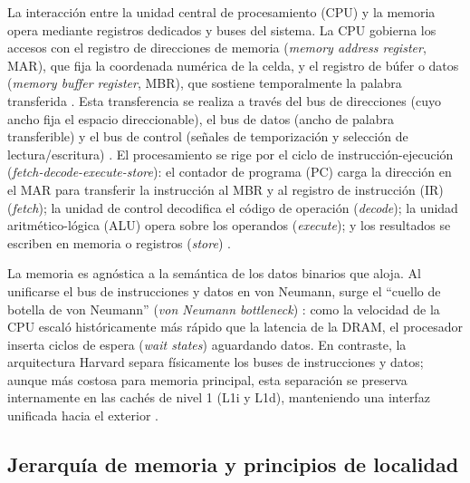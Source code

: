 \documentclass[12pt]{article}
\begin{document}
La interacción entre la unidad central de procesamiento (CPU) y la memoria opera mediante registros dedicados y buses del sistema. La CPU gobierna los accesos con el registro de direcciones de memoria (\textit{memory address register}, MAR), que fija la coordenada numérica de la celda, y el registro de búfer o datos (\textit{memory buffer register}, MBR), que sostiene temporalmente la palabra transferida \parencite[\S 1.1, p.\ 31]{stallings2018operating}. Esta transferencia se realiza a través del bus de direcciones (cuyo ancho fija el espacio direccionable), el bus de datos (ancho de palabra transferible) y el bus de control (señales de temporización y selección de lectura/escritura) \parencite[\S 2.3, p.\ 64]{deitel2004operating}. El procesamiento se rige por el ciclo de instrucción-ejecución (\textit{fetch-decode-execute-store}): el contador de programa (PC) carga la dirección en el MAR para transferir la instrucción al MBR y al registro de instrucción (IR) (\textit{fetch}); la unidad de control decodifica el código de operación (\textit{decode}); la unidad aritmético-lógica (ALU) opera sobre los operandos (\textit{execute}); y los resultados se escriben en memoria o registros (\textit{store}) \parencite[\S 1.2, p.\ 8]{silberschatz2006fundamentos}.

La memoria es agnóstica a la semántica de los datos binarios que aloja. Al unificarse el bus de instrucciones y datos en von Neumann, surge el \enquote{cuello de botella de von Neumann} (\textit{von Neumann bottleneck}) \parencite[\S 2.3, p.\ 64]{deitel2004operating}: como la velocidad de la CPU escaló históricamente más rápido que la latencia de la DRAM, el procesador inserta ciclos de espera (\textit{wait states}) aguardando datos. En contraste, la arquitectura Harvard separa físicamente los buses de instrucciones y datos; aunque más costosa para memoria principal, esta separación se preserva internamente en las cachés de nivel 1 (L1i y L1d), manteniendo una interfaz unificada hacia el exterior \parencite[\S 1.6, p.\ 49]{stallings2018operating}.

\subsection{Jerarquía de memoria y principios de localidad}
\label{sec:jerarquiaMemoriaLocalidad}
\end{document}

